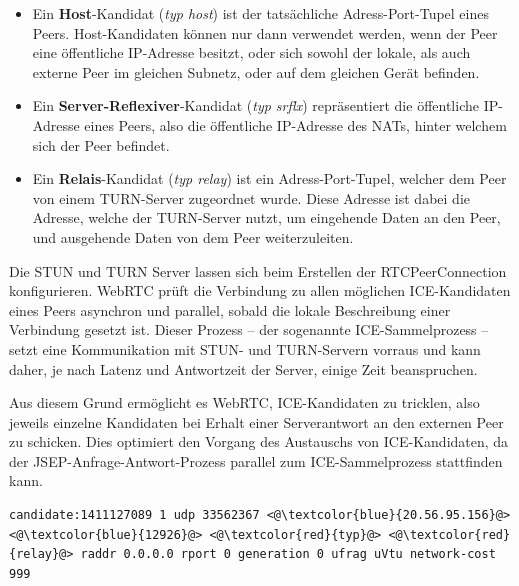 \begin{itemize}
	\item Ein \textbf{Host}-Kandidat (\textit{typ host}) ist der tatsächliche Adress-Port-Tupel eines Peers. Host-Kandidaten können nur dann verwendet werden, wenn der Peer eine öffentliche \acs{IP}-Adresse besitzt, oder sich sowohl der lokale, als auch externe Peer im gleichen Subnetz, oder auf dem gleichen Gerät befinden.
	\item Ein \textbf{Server-Reflexiver}-Kandidat (\textit{typ srflx}) repräsentiert die öffentliche \acs{IP}-Adresse eines Peers, also die öffentliche \acs{IP}-Adresse des \acs{NAT}s, hinter welchem sich der Peer befindet.
	\item Ein \textbf{Relais}-Kandidat (\textit{typ relay}) ist ein Adress-Port-Tupel, welcher dem Peer von einem \acs{TURN}-Server zugeordnet wurde. Diese Adresse ist dabei die Adresse, welche der \acs{TURN}-Server nutzt, um eingehende Daten an den Peer, und ausgehende Daten von dem Peer weiterzuleiten.
\end{itemize}

Die \acs{STUN} und \acs{TURN} Server lassen sich beim Erstellen der RTCPeerConnection konfigurieren. \acs{WebRTC} prüft die Verbindung zu allen möglichen \acs{ICE}-Kandidaten eines Peers asynchron und parallel, sobald die lokale Beschreibung einer Verbindung gesetzt ist. Dieser Prozess -- der sogenannte \glqq{}\acs{ICE}-Sammelprozess\grqq{} -- setzt eine Kommunikation mit \acs{STUN}- und \acs{TURN}-Servern vorraus und kann daher, je nach Latenz und Antwortzeit der Server, einige Zeit beanspruchen.\par

Aus diesem Grund ermöglicht es \acs{WebRTC}, \acs{ICE}-Kandidaten zu \glqq{}tricklen\grqq{}, also jeweils einzelne Kandidaten bei Erhalt einer Serverantwort an den externen Peer zu schicken. Dies optimiert den Vorgang des Austauschs von \acs{ICE}-Kandidaten, da der \acs{JSEP}-Anfrage-Antwort-Prozess parallel zum \acs{ICE}-Sammelprozess stattfinden kann.\par

\vspace{1pc}
\lstset{style=STYLE_ICE_CANDIDATE_0}
\begin{lstlisting}[caption={SDP-Datenstring eines Relais-ICE-Kandidaten},captionpos=b,label={lst:candidate}]
candidate:1411127089 1 udp 33562367 <@\textcolor{blue}{20.56.95.156}@> <@\textcolor{blue}{12926}@> <@\textcolor{red}{typ}@> <@\textcolor{red}{relay}@> raddr 0.0.0.0 rport 0 generation 0 ufrag uVtu network-cost 999
\end{lstlisting}

